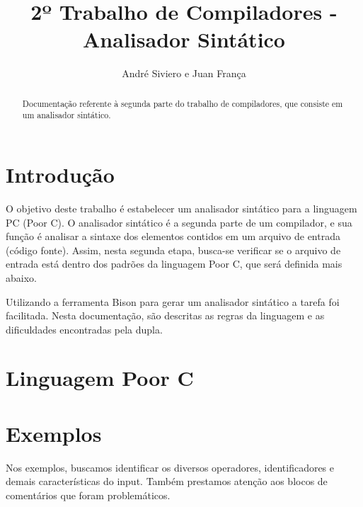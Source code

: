 \documentclass[a4paper,10pt]{article}
\title{2º Trabalho de Compiladores - Analisador Sintático}
\author{André Siviero e Juan França}
\begin{document}
\maketitle

\begin{abstract}
Documentação referente à segunda parte do trabalho de compiladores, que consiste em um analisador sintático.
\end{abstract}

\section{Introdução}
O objetivo deste trabalho é estabelecer um analisador sintático para a linguagem PC (Poor C). O analisador sintático é a segunda parte de um compilador,
e sua função é analisar a sintaxe dos elementos contidos em um arquivo de entrada (código fonte). Assim, nesta segunda etapa, busca-se verificar se o arquivo de entrada
está dentro dos padrões da linguagem Poor C, que será definida mais abaixo.

Utilizando a ferramenta Bison para gerar um analisador sintático a tarefa foi facilitada. Nesta documentação, são descritas as regras da linguagem e as dificuldades encontradas pela dupla.
\section{Linguagem Poor C}


\section{Exemplos}
Nos exemplos, buscamos identificar os diversos operadores, identificadores e demais características do input. Também prestamos atenção
aos blocos de comentários que foram problemáticos. 
\end{document}
